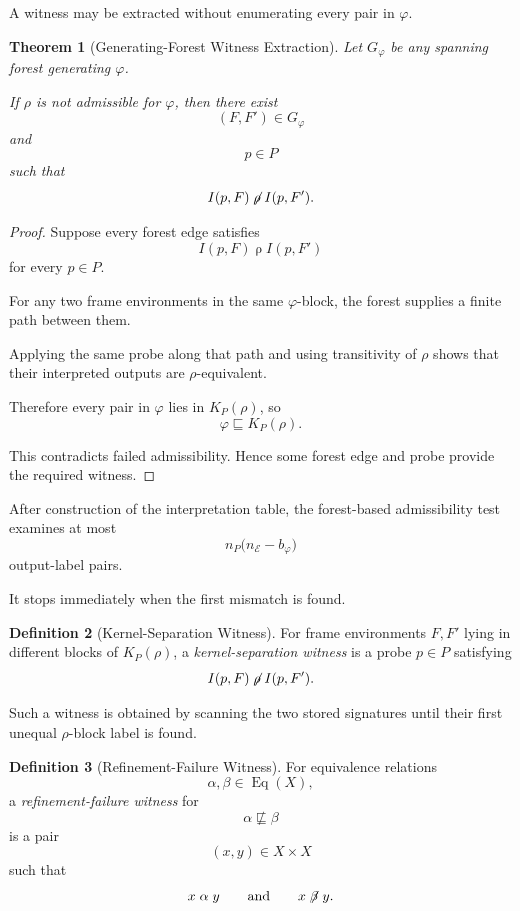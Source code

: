 \documentclass[11pt]{article}
\theoremstyle{plain}
\newtheorem{theorem}{Theorem}[section]
\theoremstyle{definition}
\newtheorem{definition}[theorem]{Definition}
\theoremstyle{remark}
\begin{document}
A witness may be extracted
without enumerating every pair in \(\varphi\).

\begin{theorem}[Generating-Forest Witness Extraction]
  \label{ik.thm.forest-witness}
  Let \(G_{\varphi}\)
  be any spanning forest generating \(\varphi\).

  If \(\rho\)
  is not admissible for \(\varphi\),
  then there exist
  \[
    (F,F')
    \in
    G_{\varphi}
  \]
  and
  \[
    p\in P
  \]
  such that
  \[
    I(p,F)
    \not\mathrel{\rho}
    I(p,F').
  \]
\end{theorem}

\begin{proof}
  Suppose every forest edge
  satisfies
  \[
    I(p,F)
    \mathrel{\rho}
    I(p,F')
  \]
  for every \(p\in P\).

  For any two frame environments
  in the same \(\varphi\)-block,
  the forest supplies a finite path
  between them.

  Applying the same probe
  along that path
  and using transitivity of \(\rho\)
  shows that their interpreted outputs
  are \(\rho\)-equivalent.

  Therefore every pair in \(\varphi\)
  lies in \(K_P(\rho)\),
  so
  \[
    \varphi
    \sqsubseteq
    K_P(\rho).
  \]

  This contradicts failed admissibility.
  Hence some forest edge and probe
  provide the required witness.
\end{proof}

After construction of the interpretation table,
the forest-based admissibility test examines at most
\[
  n_P
  \bigl(
  n_{\mathcal{E}}
  -
  b_{\varphi}
  \bigr)
\]
output-label pairs.

It stops immediately
when the first mismatch is found.

\begin{definition}[Kernel-Separation Witness]
  \label{ik.def.kernel-separation-witness}
  For frame environments \(F,F'\)
  lying in different blocks of
  \(K_P(\rho)\),
  a \emph{kernel-separation witness}
  is a probe \(p\in P\)
  satisfying
  \[
    I(p,F)
    \not\mathrel{\rho}
    I(p,F').
  \]
\end{definition}

Such a witness is obtained
by scanning the two stored signatures
until their first unequal
\(\rho\)-block label is found.

\begin{definition}[Refinement-Failure Witness]
  \label{ik.def.refinement-witness}
  For equivalence relations
  \[
    \alpha,\beta
    \in
    \operatorname{Eq}(X),
  \]
  a \emph{refinement-failure witness}
  for
  \[
    \alpha
    \not\sqsubseteq
    \beta
  \]
  is a pair
  \[
    (x,y)
    \in
    X\times X
  \]
  such that
  \[
    x\mathrel{\alpha}y
    \qquad\text{and}\qquad
    x\not\mathrel{\beta}y.
  \]
\end{definition}
\end{document}
